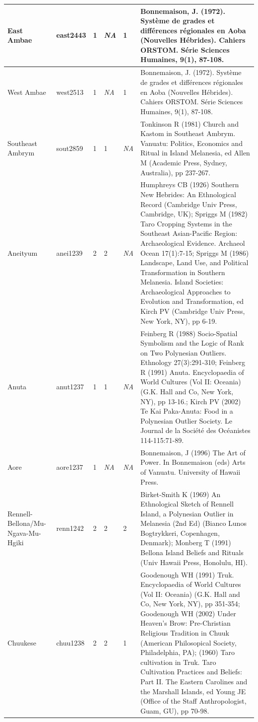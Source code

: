 \documentclass[a4paper,10pt]{article} %
\begin{document}
\begin{landscape}
\begin{longtable}{ | p{2cm}| p{2cm}| p{1.8cm}| p{1.8cm}| p{3cm}| p{9cm}| }
\hline
East Ambae&east2443&1&\emph{NA}&1&Bonnemaison, J. (1972). Système de grades et diff\'{e}rences r\'{e}gionales en Aoba (Nouvelles H\'{e}brides). Cahiers ORSTOM. S\'{e}rie Sciences Humaines, 9(1), 87-108.\\ \hline
West Ambae&west2513&1&\emph{NA}&1&Bonnemaison, J. (1972). Système de grades et diff\'{e}rences r\'{e}gionales en Aoba (Nouvelles H\'{e}brides). Cahiers ORSTOM. S\'{e}rie Sciences Humaines, 9(1), 87-108.\\ \hline
Southeast Ambrym&sout2859&1&1&\emph{NA}&Tonkinson R (1981) Church and Kastom in Southeast Ambrym. Vanuatu: Politics, Economics and Ritual in Island Melanesia, ed Allen M (Academic Press, Sydney, Australia), pp 237-267.\\ \hline
Aneityum&anei1239&2&2&\emph{NA}&Humphreys CB (1926) Southern New Hebrides: An Ethnological Record (Cambridge Univ Press, Cambridge, UK); Spriggs M (1982) Taro Cropping Systems in the Southeast Asian-Pacific Region: Archaeological Evidence. Archaeol Ocean 17(1):7-15; Spriggs M (1986) Landscape, Land Use, and Political Transformation in Southern Melanesia. Island Societies: Archaeological Approaches to Evolution and Transformation, ed Kirch PV (Cambridge Univ Press, New York, NY), pp 6-19. \\ \hline
Anuta&anut1237&1&1&\emph{NA}&Feinberg R (1988) Socio-Spatial Symbolism and the Logic of Rank on Two Polynesian Outliers. Ethnology 27(3):291-310; Feinberg R (1991) Anuta. Encyclopaedia of World Cultures (Vol II: Oceania) (G.K. Hall and Co, New York, NY), pp 13-16.; Kirch PV (2002) Te Kai Paka-Anuta: Food in a Polynesian Outlier Society. Le Journal de la Soci\'{e}t\'{e} des Oc\'{e}anistes 114-115:71-89. \\ \hline
Aore&aore1237&1&\emph{NA}&\emph{NA}&Bonnemaison, J (1996) The Art of Power. In Bonnemaison (eds) Arts of Vanuatu. University of Hawaii Press.\\ \hline
Rennell-Bellona/Mu-Ngava-Mu-Hgiki&renn1242&2&2&2&Birket-Smith K (1969) An Ethnological Sketch of Rennell Island, a Polynesian Outlier in Melanesia (2nd Ed) (Bianco Lunos Bogtrykkeri, Copenhagen, Denmark); Monberg T (1991) Bellona Island Beliefs and Rituals (Univ Hawaii Press, Honolulu, HI). \\ \hline
Chuukese&chuu1238&2&2&1&Goodenough WH (1991) Truk. Encyclopaedia of World Cultures (Vol II: Oceania) (G.K. Hall and Co, New York, NY), pp 351-354; Goodenough WH (2002) Under Heaven's Brow: Pre-Christian Religious Tradition in Chuuk (American Philosopical Society, Philadelphia, PA); (1960) Taro cultivation in Truk. Taro Cultivation Practices and Beliefs: Part II. The Eastern Carolines and the Marshall Islands, ed Young JE (Office of the Staff Anthropologist, Guam, GU), pp 70-98. \\ \hline

\end{longtable}
\end{landscape}
\end{document}
